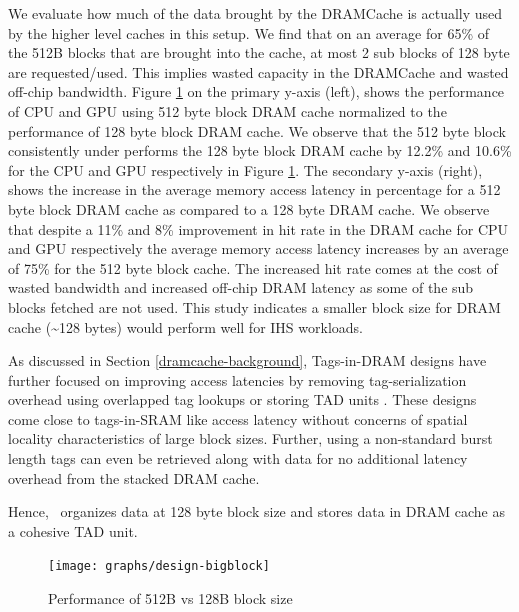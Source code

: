 \par We evaluate how much of the data brought by the DRAMCache is actually used by the higher level caches in this setup. We find that on an average for 65\% of the 512B blocks that are brought into the cache, at most 2 sub blocks of 128 byte are requested/used. This implies wasted capacity in the DRAMCache and wasted off-chip bandwidth.
Figure \ref{fig:design-bigblock} on the primary y-axis (left), shows the performance of CPU and GPU using 512 byte block DRAM cache normalized to the performance of 128 byte block DRAM cache. We observe that the 512 byte block consistently under performs the 128 byte block DRAM cache by 12.2\% and 10.6\% for the CPU and GPU respectively in Figure \ref{fig:design-bigblock}. The secondary y-axis (right), shows the increase in the average memory access latency in percentage for a 512 byte block DRAM cache as compared to a 128 byte DRAM cache. We observe that despite a 11\% and 8\% improvement in hit rate in the DRAM cache for CPU and GPU respectively the average memory access latency increases by an average of 75\% for the 512 byte block cache. The increased hit rate comes at the cost of wasted bandwidth and increased off-chip DRAM latency as some of the sub blocks fetched are not used. This study indicates a smaller block size for DRAM cache (\textasciitilde128 bytes) would perform well for IHS workloads.
\par As discussed in Section \ref{dramcache-background}, Tags-in-DRAM designs have further focused on improving access latencies by removing tag-serialization overhead using overlapped tag lookups \cite{loh-hill} or storing TAD units \cite{alloy}. These designs come close to tags-in-SRAM like access latency without concerns of spatial locality characteristics of large block sizes. Further, using a non-standard burst length tags can even be retrieved along with data for no additional latency overhead from the stacked DRAM cache.
\par Hence, \cachename\ organizes data at 128 byte block size and stores data in DRAM cache as a cohesive TAD unit.

\begin{figure}[htbp]
   \centering
   \texttt{[image: graphs/design-bigblock]}
   \caption{Performance of 512B vs 128B block size}	
   \label{fig:design-bigblock}
\end{figure}

